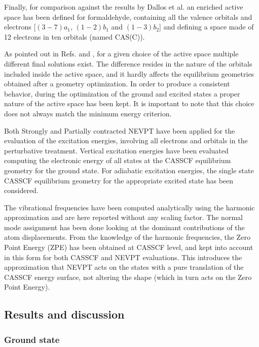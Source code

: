 Finally, for comparison against the results by Dallos et
al.\cite{jcp-114-746-2001} an enriched active space has been defined for
formaldehyde, containing all the valence orbitals and electrons
[$(3-7)a_{1}$, $(1-2)b_1$ and $(1-3)b_2$] and defining a space made of 12
electrons in ten orbitals (named CAS(C)). 

As pointed out in Refs.  and
, for a given choice of the active space multiple
different final solutions exist. The difference resides in the nature of
the orbitals included inside the active space, and it hardly affects the
equilibrium geometries obtained after a geometry optimization.  In order to
produce a consistent behavior, during the optimization of the ground and
excited states a proper nature of the active space has been kept.  It is
important to note that this choice does not always match the minimum energy
criterion.

Both Strongly and Partially contracted NEVPT have been applied
for the evaluation of the excitation energies, involving all electrons and
orbitals in the perturbative treatment.  Vertical excitation energies have
been evaluated computing the electronic energy of all states at the CASSCF
equilibrium geometry for the ground state. For adiabatic excitation
energies, the single state CASSCF equilibrium geometry for the appropriate
excited state has been considered.

The vibrational frequencies have been computed analytically using the
harmonic approximation and are here reported without any scaling factor. The
normal mode assignment has been done looking at the dominant contributions
of the atom displacements.  From the knowledge of the harmonic frequencies,
the Zero Point Energy (ZPE) has been obtained at CASSCF level, and kept into
account in this form for both CASSCF and NEVPT evaluations.  This introduces
the approximation that NEVPT acts on the states with a pure translation of
the CASSCF energy surface, not altering the shape (which in turn acts on
the Zero Point Energy).


\subsection*{Results and discussion}
\subsubsection*{Ground state}

